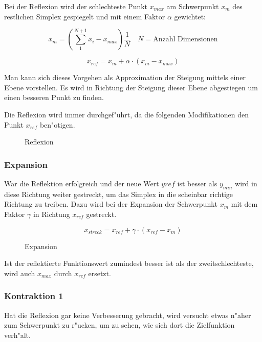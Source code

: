 Bei der Reflexion wird der schlechteste Punkt $x_{max}$ am Schwerpunkt $x_m$ des restlichen Simplex gespiegelt und mit einem Faktor $\alpha$ gewichtet:

\begin{equation}
x_m = \left(\sum_1^{N+1} x_i - x_{max}\right) \frac{1}{N} \quad N = \text{Anzahl Dimensionen}
\end{equation}

\begin{equation}
x_{ref} = x_m + \alpha \cdot (x_m-x_{max})
\end{equation}

Man kann sich dieses Vorgehen als Approximation der Steigung mittels einer Ebene vorstellen.
Es wird in Richtung der Steigung dieser Ebene abgestiegen um einen besseren Punkt zu finden.

Die Reflexion wird immer durchgef"uhrt, da die folgenden Modifikationen den Punkt $x_{ref}$ ben"otigen.

\begin{figure}[h]
	\centering
  	\caption{Reflexion}%
	\label{fig:Reflexion}%
\end{figure}

\subsubsection{Expansion}
War die Reflektion erfolgreich und der neue Wert $y{ref}$ ist besser als $y_{min}$ wird in diese Richtung weiter gestreckt, um das Simplex in die scheinbar richtige Richtung zu treiben.
Dazu wird bei der Expansion der Schwerpunkt $x_m$ mit dem Faktor $\gamma$ in Richtung $x_{ref}$ gestreckt.

\begin{equation}
x_{streck} = x_{ref} + \gamma \cdot (x_{ref}-x_{m})
\end{equation}
\begin{figure}[h]
	\centering
  	\caption{Expansion}%
	\label{fig:Streckung}%
\end{figure}

Ist der reflektierte Funktionswert zumindest besser ist als der zweitschlechteste, wird auch $x_{max}$ durch $x_{ref}$ ersetzt.


\subsubsection{Kontraktion 1}

Hat die Reflexion gar keine Verbesserung gebracht, wird versucht etwas n"aher zum Schwerpunkt zu r"ucken, um zu sehen, wie sich dort die Zielfunktion verh"alt.

